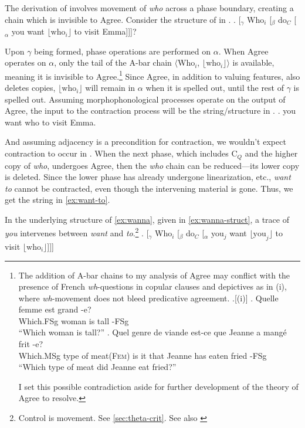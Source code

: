 \documentclass[MilwayThesis]{subfiles}
\begin{document}
The derivation of \Last[b] involves movement of \textit{who} across a phase boundary, creating a chain which is invisible to Agree.
Consider the structure of \Last[b] in \Next.
\ex. \label{fig:star-wanna-tree}
[$_\gamma$ Who$_i$ [$_\beta$ do$_C$ [$_\alpha$ you want $\lfloor\text{who}_{i}\rfloor$ to visit Emma]]]?

Upon $\gamma$ being formed, phase operations are performed on $\alpha$.
When Agree operates on $\alpha$, only the tail of the A-bar chain $\langle$Who$_i$, $\lfloor\text{who}_{i}\rfloor\rangle$ is available, meaning it is invisible to Agree.\footnote{
	The addition of A-bar chains to my analysis of Agree may conflict with the presence of French \textit{wh}-questions in copular clauses and depictives as in (i), where \textit{wh}-movement does not bleed predicative agreement.
	\ex.[(i)]\label{ex:wh-french}
	\ag. Quelle femme est grand -e?\\
	Which.FSg woman is tall -FSg\\
	``Which woman is tall?''
	\bg. Quel genre de viande est-ce que Jeanne a mang\'{e} frit -e?\\
	Which.MSg type of meat(\textsc{Fem}) {is it} that Jeanne has eaten fried -FSg\\
	``Which type of meat did Jeanne eat fried?''

	I set this possible contradiction aside for further development of the theory of Agree to resolve.
}
Since Agree, in addition to valuing features, also deletes copies, $\lfloor\text{who}_{i}\rfloor$ will remain in $\alpha$ when it is spelled out, until the rest of $\gamma$ is spelled out.
Assuming morphophonological processes operate on the output of Agree, the input to the contraction process will be the string/structure in \Next.
\ex. you want who to visit Emma.

And assuming adjacency is a precondition for contraction, we wouldn't expect contraction to occur in \Last.
When the next phase, which includes C$_{Q}$ and the higher copy of \textit{who}, undergoes Agree, then the \textit{who} chain can be reduced---its lower copy is deleted.
Since the lower phase has already undergone linearization, etc., \textit{want to} cannot be contracted, even though the intervening material is gone.
Thus, we get the string in \cref{ex:want-to}.

In the underlying structure of \cref{ex:wanna}, given in \cref{ex:wanna-struct}, a trace of \textit{you} intervenes between \textit{want} and \textit{to}.\footnote{
	Control is movement.
	See \cref{sec:theta-crit}.
	See also \textcite{hornstein1999movement}
}
\ex.\label{ex:wanna-struct} [$_{\gamma}$ Who$_{i}$ [$_{\beta}$ do$_{C}$ [$_{\alpha}$ you$_{j}$ want $\lfloor\text{you}_{j}\rfloor$ to visit $\lfloor\text{who}_{i}\rfloor$]]] 
\end{document}
